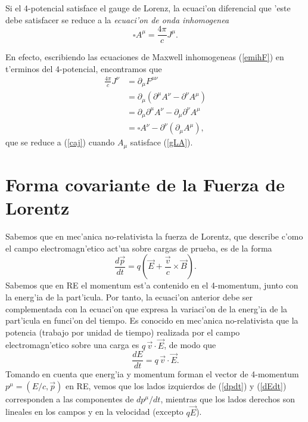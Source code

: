 Si el 4-potencial satisface el gauge de Lorenz, la ecuaci'on diferencial que 'este debe satisfacer se reduce a la \textit{ecuaci'on de onda inhomogenea}
\begin{equation}
\boxed{\square A^\mu=\frac{4\pi}{c}J^\mu .} \label{caj}
\end{equation}

En efecto, escribiendo las ecuaciones de Maxwell inhomogeneas (\ref{emihF}) en t'erminos del 4-potencial, encontramos que
\begin{align}
\frac{4\pi}{c}J^\nu &=\partial_\mu F^{\mu\nu}  \\
&=\partial_\mu \left(  \partial^\mu A^\nu -\partial^\nu A^\mu \right)  \\
&= \partial_\mu \partial^\mu A^\nu -\partial_\mu \partial^\nu A^\mu   \\
&= \square A^\nu -\partial^\nu (\partial_\mu A^\mu)   ,
\end{align}
que se reduce a (\ref{caj}) cuando $A_\mu$ satisface (\ref{gLA}).

\section{Forma covariante de la Fuerza de Lorentz}
Sabemos que en mec'anica no-relativista la fuerza de Lorentz, que describe c'omo el campo electromagn'etico act'ua sobre cargas de prueba, es de la forma
\begin{equation}
\frac{d\vec{p}}{dt}=q\left(  \vec{E}+\frac{\vec{v}}{c}\times\vec{B}\right).
\label{dpdt}
\end{equation}
Sabemos que en RE el momentum est'a contenido en el 4-momentum, junto con la
energ'ia de la part'icula. Por tanto, la ecuaci'on anterior debe ser
complementada con la ecuaci'on que expresa la variaci'on de la energ'ia de la
part'icula en funci'on del tiempo. Es conocido en mec'anica no-relativista que
la potencia (trabajo por unidad de tiempo) realizada por el campo
electromagn'etico sobre una carga es $q\,\vec{v}\cdot\vec{E}$, de modo que
\begin{equation}
\frac{dE}{dt}=q\,\vec{v}\cdot\vec{E}. \label{dEdt}
\end{equation}
Tomando en cuenta que energ'ia y momentum forman el vector de 4-momentum $p^\mu=({E}/{c},\vec{p})$ en RE, vemos que los lados
izquierdos de (\ref{dpdt}) y (\ref{dEdt}) corresponden a las componentes de
${dp^\mu}/{dt}$, mientras que los lados derechos son lineales en los campos
y en la velocidad (excepto $q\vec{E}$).

